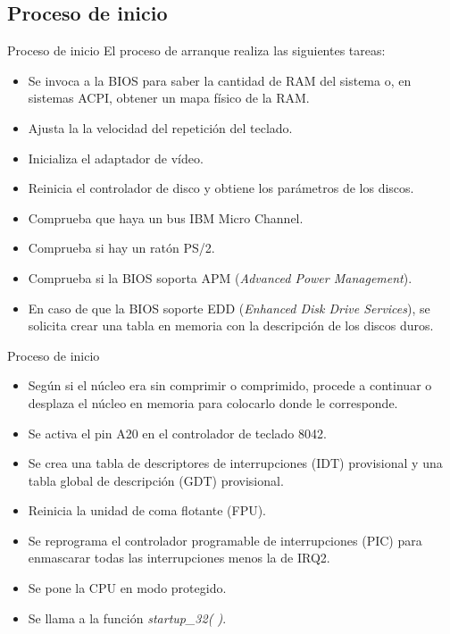 \subsection{Proceso de inicio}
\begin{frame}{Proceso de inicio}
	El proceso de arranque realiza las siguientes tareas:
	\begin{itemize}
		\item Se invoca a la BIOS para saber la cantidad de RAM del sistema o, en sistemas ACPI, obtener un mapa físico de la RAM.
		\item Ajusta la la velocidad del repetición del teclado.
		\item Inicializa el adaptador de vídeo.
		\item Reinicia el controlador de disco y obtiene los parámetros de los discos.
		\item Comprueba que haya un bus IBM Micro Channel.
		\item Comprueba si hay un ratón PS/2.
		\item Comprueba si la BIOS soporta APM (\emph{Advanced Power Management}).
		\item En caso de que la BIOS soporte EDD (\emph{Enhanced Disk Drive Services}), se solicita crear una tabla en memoria con la descripción de los discos duros.
	\end{itemize}
\end{frame}
\begin{frame}{Proceso de inicio}
	\begin{itemize}
 		\item Según si el núcleo era sin comprimir o comprimido, procede a continuar o desplaza el núcleo en memoria para colocarlo donde le corresponde.
		\item Se activa el pin A20 en el controlador de teclado 8042.
		\item Se crea una tabla de descriptores de interrupciones (IDT) provisional y una tabla global de descripción (GDT) provisional.
		\item Reinicia la unidad de coma flotante (FPU).
		\item Se reprograma el controlador programable de interrupciones (PIC) para enmascarar todas las interrupciones menos la de IRQ2.
		\item Se pone la CPU en modo protegido.
		\item Se llama a la función \emph{startup\_32( )}.
	\end{itemize}
\end{frame}

